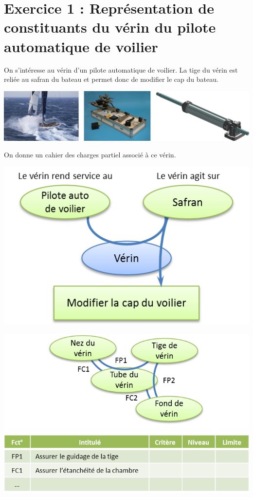 \documentclass[11pt,oneside]{article}
\begin{document}
\section*{Exercice 1 : Représentation de constituants du vérin du pilote automatique de voilier}

On s'intéresse au vérin d'un pilote automatique de voilier. La tige du vérin est reliée au safran du bateau et permet donc de modifier le cap du bateau. 

\begin{center}
\includegraphics[width=.9\textwidth]{png/fig1}
\end{center}

On donne un cahier des charges partiel associé à ce vérin.

\begin{minipage}[c]{.45\linewidth}
\begin{center}
\includegraphics[width=.9\textwidth]{png/fig2}
\end{center}
\end{minipage} \hfill
\begin{minipage}[c]{.45\linewidth}
\begin{center}
\includegraphics[width=.9\textwidth]{png/fig3}
\end{center}
\end{minipage} 
\end{document}
